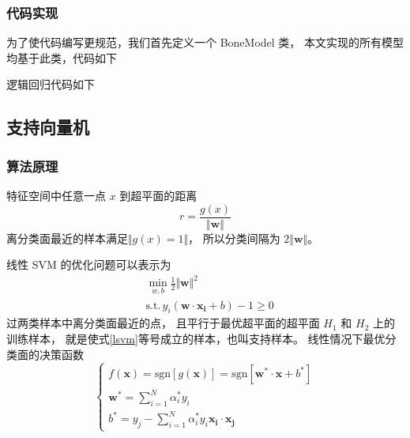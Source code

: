 \documentclass[cn,hazy,blue,14pt,normal]{elegantnote}
\newcommand{\sgn}{\text{sgn}}
\begin{document}
\subsubsection{代码实现}
为了使代码编写更规范，我们首先定义一个 BoneModel 类，
本文实现的所有模型均基于此类，代码如下


逻辑回归代码如下




\subsection{支持向量机}
\subsubsection{算法原理}
特征空间中任意一点 $x$ 到超平面的距离
\begin{equation}
    r = \frac{g(x)}{ \Vert \boldsymbol{w} \Vert }
\end{equation}
离分类面最近的样本满足$\Vert g(x) = 1\Vert$，
所以分类间隔为 $2\Vert \boldsymbol{w}\Vert$。

线性 SVM 的优化问题可以表示为
\begin{equation}
    \label{lsvm}
    \begin{aligned}
         & \min_{w,b} \frac{1}{2} \Vert \boldsymbol{w} \Vert^2\,                   \\
         & \text{s.t.}\, y_i(\boldsymbol{w} \cdot\boldsymbol{x_i} + b) - 1 \geq  0
    \end{aligned}
\end{equation}
过两类样本中离分类面最近的点，
且平行于最优超平面的超平面 $H_1$ 和 $H_2$ 上的训练样本，
就是使式\ref{lsvm}等号成立的样本，也叫支持样本。
线性情况下最优分类面的决策函数
\begin{equation}
    \begin{cases}
        f(\boldsymbol{x})   = \sgn[g (\boldsymbol{x})]
        = \sgn[\boldsymbol{w^\ast} \cdot \boldsymbol{x} + b^\ast] \\
        \boldsymbol{w^\ast} =\sum^N_{i = 1}\alpha^\ast_i y_i      \\
        b^\ast = y_j - \sum^N_{i = 1}\alpha^\ast_i y_i \boldsymbol{x_i}\cdot\boldsymbol{x_j}
    \end{cases}
\end{equation}
\end{document}

